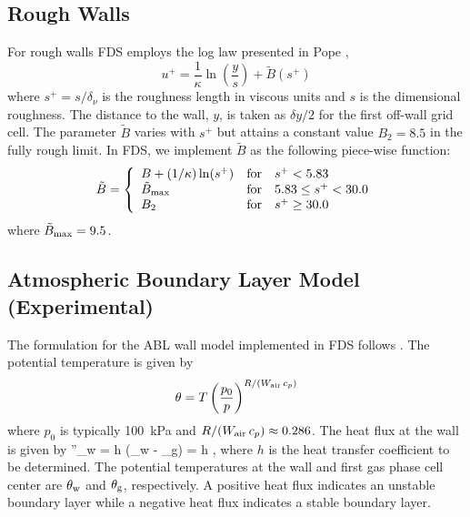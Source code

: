 \subsection{Rough Walls}
\label{rough_wall_model}

For rough walls FDS employs the log law presented in Pope \cite{Pope:2000},
\begin{equation}
\label{eqn_roughwallloglaw}
u^+ = \frac{1}{\kappa} \ln \left(\frac{y}{s}\right) + \tilde{B}(s^+)
\end{equation}
where $s^+ = s/\delta_\nu$ is the roughness length in viscous units and $s$ is the dimensional roughness. The distance to the wall, $y$, is taken as $\delta y/2$ for the first off-wall grid cell.  The parameter $\tilde{B}$ varies with $s^+$ but attains a constant value $B_2=8.5$ in the fully rough limit.  In FDS, we implement $\tilde{B}$ as the following piece-wise function:
\begin{equation}
\tilde{B} = \left\{ \begin{array}{lll} B + (1/\kappa)\ln(s^+)  & \mbox{for} &          s^+ < 5.83 \\
                                       \tilde{B}_{\rm max}     & \mbox{for} & 5.83 \le s^+ < 30.0 \\
                                       B_2                     & \mbox{for} &          s^+ \ge 30.0 \end{array} \right.
\end{equation}
where $\tilde{B}_{\rm max} = 9.5$.

\subsection{Atmospheric Boundary Layer Model (Experimental)}
\label{sec:abl_wall_model}

The formulation for the ABL wall model implemented in FDS follows \cite{Stoll:2008}.  The potential temperature is given by $$\theta=T \left( \frac{p_0}{p} \right)^{R/(W_{\rm air} \, c_p)}$$ where $p_0$ is typically 100~kPa and $R/(W_{\rm air} \, c_p) \approx 0.286$.  The heat flux at the wall is given by
\be
{}''_{\rm w} = h (\theta_{\rm w} - \theta_{\rm g}) = h\,\Delta \theta \,\mbox{,}
\ee
where $h$ is the heat transfer coefficient to be determined.  The potential temperatures at the wall and first gas phase cell center are $\theta_{\rm w}$ and $\theta_{\rm g}$, respectively.  A positive heat flux indicates an unstable boundary layer while a negative heat flux indicates a stable boundary layer.

